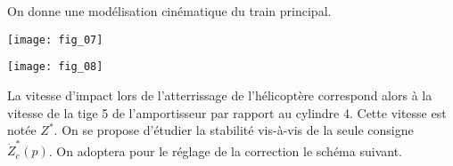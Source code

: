 \ifprof
\else

On donne une modélisation cinématique du train principal. 
\begin{center}
\begin{minipage}[c]{.48\linewidth}
\begin{center}
\texttt{[image: fig\_07]}
\end{center}
\end{minipage} \hfill
\begin{minipage}[c]{.48\linewidth}
\begin{center}
\texttt{[image: fig\_08]}
\end{center}
\end{minipage} \end{center}
La vitesse d'impact lors de l'atterrissage de l'hélicoptère correspond alors à la vitesse de la tige 5 de l'amportisseur par rapport au cylindre 4. Cette vitesse est notée $Z^*$. On se propose d'étudier la stabilité vis-à-vis de la seule consigne  $\dot{Z}_c^*(p)$. On adoptera pour le réglage de la correction le schéma suivant.



\footnotesize
\begin{center}
\end{center}
\normalsize


